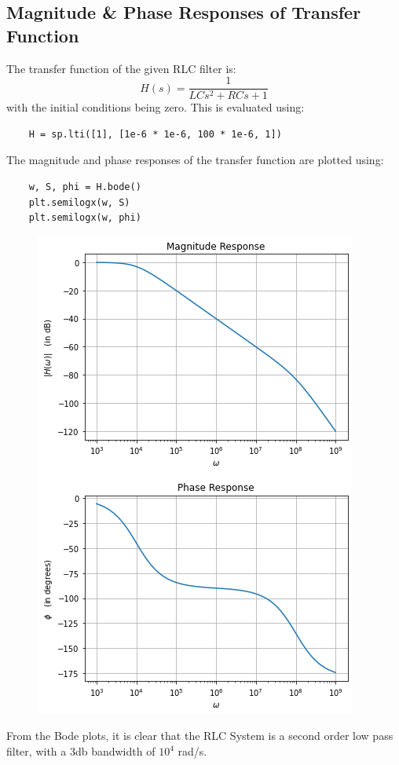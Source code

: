 \documentclass[12pt, a4paper]{article}
\begin{document}
\subsection{Magnitude \& Phase Responses of Transfer Function}
The transfer function of the given RLC filter is:
\[ H(s) = \frac{1}{LCs^2 + RCs + 1}\]
with the initial conditions being zero. This is evaluated using:
\begin{lstlisting}
    H = sp.lti([1], [1e-6 * 1e-6, 100 * 1e-6, 1])
\end{lstlisting}
The magnitude and phase responses of the transfer function are plotted using:
\begin{lstlisting}
    w, S, phi = H.bode()
    plt.semilogx(w, S)
    plt.semilogx(w, phi)
\end{lstlisting}
\begin{figure}[H]
    \centering
    \includegraphics[scale=0.6]{5.png}
\end{figure}

From the Bode plots, it is clear that the RLC System is a second order low pass filter,
with a 3db bandwidth of $10^4$ rad/s.
\pagebreak
\end{document}
